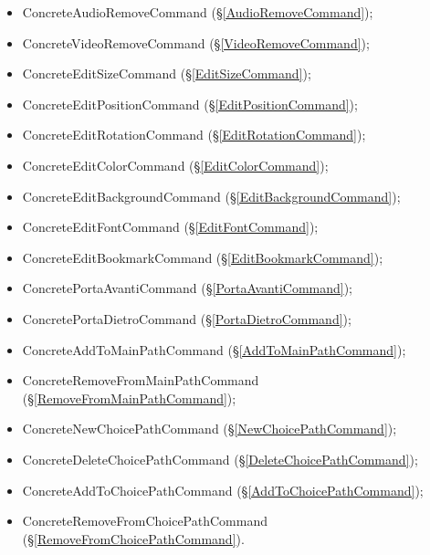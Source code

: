 {{{\begin{itemize}
			\item ConcreteAudioRemoveCommand (\S\ref{AudioRemoveCommand});
			\item ConcreteVideoRemoveCommand (\S\ref{VideoRemoveCommand});
			\item ConcreteEditSizeCommand (\S\ref{EditSizeCommand});
			\item ConcreteEditPositionCommand (\S\ref{EditPositionCommand});
			\item ConcreteEditRotationCommand (\S\ref{EditRotationCommand});
			\item ConcreteEditColorCommand (\S\ref{EditColorCommand});
			\item ConcreteEditBackgroundCommand (\S\ref{EditBackgroundCommand});
			\item ConcreteEditFontCommand (\S\ref{EditFontCommand});
			\item ConcreteEditBookmarkCommand (\S\ref{EditBookmarkCommand});
			\item ConcretePortaAvantiCommand (\S\ref{PortaAvantiCommand});
			\item ConcretePortaDietroCommand (\S\ref{PortaDietroCommand});
			\item ConcreteAddToMainPathCommand (\S\ref{AddToMainPathCommand});
			\item ConcreteRemoveFromMainPathCommand (\S\ref{RemoveFromMainPathCommand});
			\item ConcreteNewChoicePathCommand (\S\ref{NewChoicePathCommand});
			\item ConcreteDeleteChoicePathCommand (\S\ref{DeleteChoicePathCommand});
			\item ConcreteAddToChoicePathCommand (\S\ref{AddToChoicePathCommand});
			\item ConcreteRemoveFromChoicePathCommand (\S\ref{RemoveFromChoicePathCommand}).
		\end{itemize}
	}
}}
